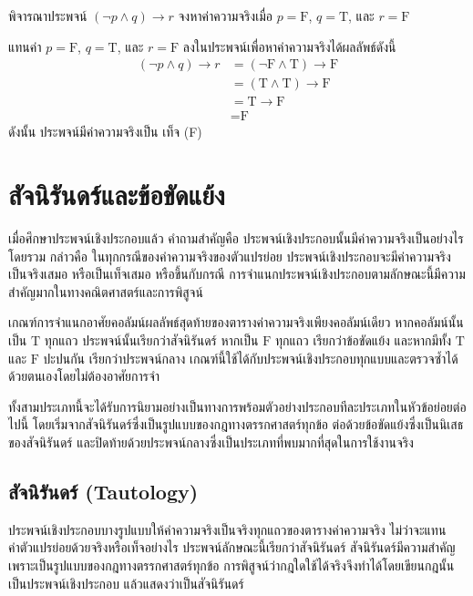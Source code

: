 \bigskip

\begin{ex}
\label{ex:evaluate-proposition}
พิจารณาประพจน์ $(\neg p \land q) \rightarrow r$ จงหาค่าความจริงเมื่อ $p = \text{F}$, $q = \text{T}$, และ $r = \text{F}$
\end{ex}

\begin{solution}
แทนค่า $p = \text{F}$, $q = \text{T}$, และ $r = \text{F}$ ลงในประพจน์เพื่อหาค่าความจริงได้ผลลัพธ์ดังนี้
\begin{align*}
    (\neg p \land q) \rightarrow r &= (\neg \text{F} \land \text{T}) \rightarrow \text{F} \\
    &= (\text{T} \land \text{T}) \rightarrow \text{F} \\
    &= \text{T} \rightarrow \text{F} \\
    &= \text{F}
\end{align*}
ดังนั้น ประพจน์มีค่าความจริงเป็น เท็จ (F) \solhere
\end{solution}

\section{สัจนิรันดร์และข้อขัดแย้ง}
\label{sec:tautology}

เมื่อศึกษาประพจน์เชิงประกอบแล้ว คำถามสำคัญคือ ประพจน์เชิงประกอบนั้นมีค่าความจริงเป็นอย่างไรโดยรวม กล่าวคือ ในทุกกรณีของค่าความจริงของตัวแปรย่อย ประพจน์เชิงประกอบจะมีค่าความจริงเป็นจริงเสมอ หรือเป็นเท็จเสมอ หรือขึ้นกับกรณี การจำแนกประพจน์เชิงประกอบตามลักษณะนี้มีความสำคัญมากในทางคณิตศาสตร์และการพิสูจน์~\parencite{hurley2024logic}

เกณฑ์การจำแนกอาศัยคอลัมน์ผลลัพธ์สุดท้ายของตารางค่าความจริงเพียงคอลัมน์เดียว หากคอลัมน์นั้นเป็น $\text{T}$ ทุกแถว ประพจน์นั้นเรียกว่าสัจนิรันดร์ หากเป็น $\text{F}$ ทุกแถว เรียกว่าข้อขัดแย้ง และหากมีทั้ง $\text{T}$ และ $\text{F}$ ปะปนกัน เรียกว่าประพจน์กลาง เกณฑ์นี้ใช้ได้กับประพจน์เชิงประกอบทุกแบบและตรวจซ้ำได้ด้วยตนเองโดยไม่ต้องอาศัยการจำ

ทั้งสามประเภทนี้จะได้รับการนิยามอย่างเป็นทางการพร้อมตัวอย่างประกอบทีละประเภทในหัวข้อย่อยต่อไปนี้ โดยเริ่มจากสัจนิรันดร์ซึ่งเป็นรูปแบบของกฎทางตรรกศาสตร์ทุกข้อ ต่อด้วยข้อขัดแย้งซึ่งเป็นนิเสธของสัจนิรันดร์ และปิดท้ายด้วยประพจน์กลางซึ่งเป็นประเภทที่พบมากที่สุดในการใช้งานจริง

\subsection{สัจนิรันดร์ (Tautology)}
ประพจน์เชิงประกอบบางรูปแบบให้ค่าความจริงเป็นจริงทุกแถวของตารางค่าความจริง ไม่ว่าจะแทนค่าตัวแปรย่อยด้วยจริงหรือเท็จอย่างไร ประพจน์ลักษณะนี้เรียกว่าสัจนิรันดร์ สัจนิรันดร์มีความสำคัญเพราะเป็นรูปแบบของกฎทางตรรกศาสตร์ทุกข้อ การพิสูจน์ว่ากฎใดใช้ได้จริงจึงทำได้โดยเขียนกฎนั้นเป็นประพจน์เชิงประกอบ แล้วแสดงว่าเป็นสัจนิรันดร์~\parencite{mendelson2015introduction}

